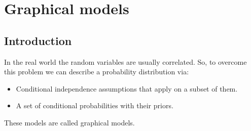 \documentclass[12pt, a4paper]{report}
\newtheorem[style=M,bodystyle=\normalfont]{theorem}{Theorem}
\newtheorem[style=M,bodystyle=\normalfont]{corollary}{Corollary}
\newtheorem[style=M,bodystyle=\normalfont]{lemma}{Lemma}
\newtheorem[style=M,bodystyle=\normalfont]{definition}{Definition}
\begin{document}
\newpage

\chapter{Graphical models}
    \section{Introduction}
    In the real world the random variables are usually correlated. So, to overcome this problem we can describe a probability distribution via: 
    \begin{itemize}
        \item Conditional independence assumptions that apply on a subset of them. 
        \item A set of conditional probabilities with their priors. 
    \end{itemize}
    These models are called graphical models. 
\end{document}
